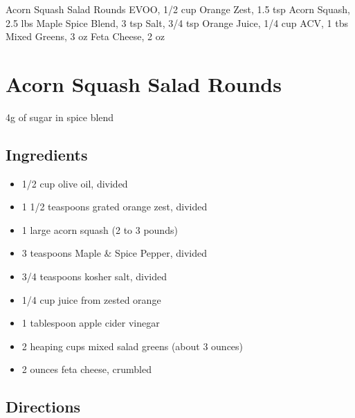 Acorn Squash Salad Rounds
  EVOO, 1/2 cup
  Orange Zest, 1.5 tsp
  Acorn Squash, 2.5 lbs
  Maple Spice Blend, 3 tsp
  Salt, 3/4 tsp
  Orange Juice, 1/4 cup
  ACV, 1 tbs
  Mixed Greens, 3 oz
  Feta Cheese, 2 oz

\section{ Acorn Squash Salad Rounds }

4g of sugar in spice blend

\subsection{ Ingredients }

\begin{itemize}
  \item 1/2 cup olive oil, divided
  \item 1 1/2 teaspoons grated orange zest, divided
  \item 1 large acorn squash (2 to 3 pounds)
  \item 3 teaspoons Maple \& Spice Pepper, divided
  \item 3/4 teaspoons kosher salt, divided
  \item 1/4 cup juice from zested orange
  \item 1 tablespoon apple cider vinegar
  \item 2 heaping cups mixed salad greens (about 3 ounces)
  \item 2 ounces feta cheese, crumbled
\end{itemize}

\subsection{ Directions }

